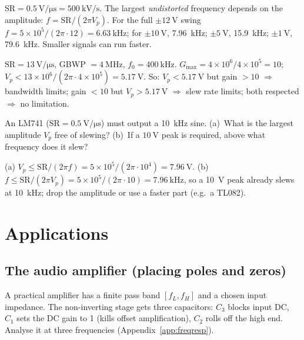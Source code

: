 \documentclass[11pt,a4paper,oneside]{book}
\begin{document}
\begin{wexample}
$\text{SR}=\qty{0.5}{\volt\per\micro\second}=\qty{500}{\kilo\volt\per\second}$.
The largest \emph{undistorted} frequency depends on the amplitude:
$f=\text{SR}/(2\pi V_p)$. For the full $\pm\qty{12}{\volt}$ swing
$f=5\times10^5/(2\pi\cdot12)=\qty{6.63}{\kilo\hertz}$; for $\pm\qty{10}{\volt}$,
\qty{7.96}{\kilo\hertz}; $\pm\qty{5}{\volt}$, \qty{15.9}{\kilo\hertz};
$\pm\qty{1}{\volt}$, \qty{79.6}{\kilo\hertz}. Smaller signals can run faster.
\end{wexample}

\begin{wexample}
$\text{SR}=\qty{13}{\volt\per\micro\second}$, GBWP $=\qty{4}{\mega\hertz}$,
$f_0=\qty{400}{\kilo\hertz}$. $G_{\max}=4\times10^6/4\times10^5=10$;
$V_p<13\times10^6/(2\pi\cdot4\times10^5)=\qty{5.17}{\volt}$. So: $V_p<\qty{5.17}{\volt}$
but gain $>10$ $\Rightarrow$ bandwidth limits; gain $<10$ but
$V_p>\qty{5.17}{\volt}$ $\Rightarrow$ slew rate limits; both respected
$\Rightarrow$ no limitation.
\end{wexample}

\begin{exercise}
An LM741 ($\text{SR}=\qty{0.5}{\volt\per\micro\second}$) must output a
\qty{10}{\kilo\hertz} sine. (a)~What is the largest amplitude $V_p$ free of
slewing? (b)~If a $\qty{10}{\volt}$ peak is required, above what frequency does it
slew?
\end{exercise}
\begin{solution}
(a) $V_p\le\text{SR}/(2\pi f)=5\times10^{5}/(2\pi\cdot10^{4})=\qty{7.96}{\volt}$.
(b) $f\le\text{SR}/(2\pi V_p)=5\times10^{5}/(2\pi\cdot10)=\qty{7.96}{\kilo\hertz}$,
so a \qty{10}{\volt} peak already slews at \qty{10}{\kilo\hertz}; drop the
amplitude or use a faster part (e.g.\ a TL082).
\end{solution}

\chapter{Applications}\label{ch:apps}

\section{The audio amplifier (placing poles and zeros)}
A practical amplifier has a finite pass band $[f_L,f_H]$ and a chosen input
impedance. The non-inverting stage gets three capacitors: $C_3$ blocks input DC,
$C_1$ sets the DC gain to 1 (kills offset amplification), $C_2$ rolls off the
high end. Analyse it at three frequencies (Appendix~\ref{app:freqresp}).
\end{document}
